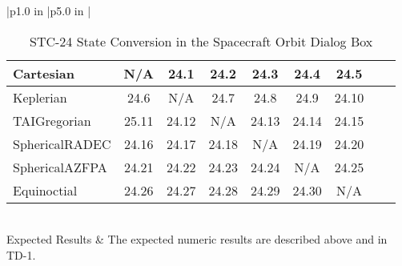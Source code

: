 \begin{table}[htbp!]
\begin{tabular}{|p{1.0 in} |p{5.0 in} |}
\begin{centering}
\begin{tabular}{|l|c|c|c|c|c|c|c|c|}
             Cartesian & N/A & 24.1 & 24.2 & 24.3 & 24.4 & 24.5\\ \hline
             Keplerian & 24.6 & N/A & 24.7 & 24.8 & 24.9 & 24.10 \\ \hline
             TAIGregorian & 25.11 & 24.12 & N/A & 24.13 & 24.14 & 24.15 \\ \hline
             SphericalRADEC & 24.16 & 24.17 & 24.18 & N/A & 24.19 & 24.20 \\ \hline
             SphericalAZFPA & 24.21 & 24.22 & 24.23 & 24.24 & N/A & 24.25 \\ \hline
             Equinoctial & 24.26 & 24.27 & 24.28 & 24.29 & 24.30 &  N/A\\ \hline
          \end{tabular}
          \end{centering} \vspace{0.1 in}\\
         \hline
         Expected Results & The expected numeric results are described above and in TD-1.\\
      \hline
\end{tabular}
   \label{Table:STC-24}
   \caption{STC-24 State Conversion in the Spacecraft Orbit Dialog Box}
\end{table} 